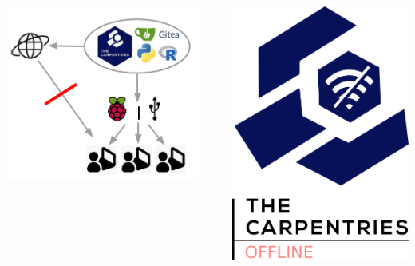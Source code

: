 \documentclass{beamer}
\date{September 5, 2023}
\author{JSS \inst{1} \and FT \inst{1} \and CS \inst{2} \\
	\and AD \inst{3} \and EPW \inst{4} \and SF \inst{5}}
\begin{document}
	\begin{frame}
		\begin{columns}
			\begin{column}{\textwidth}
				\begin{alertblock}
				\end{alertblock}
			\end{column}
		\end{columns}
		\begin{columns}
			\begin{column}{.45\textwidth}
				\centering
				\includegraphics[width=.6\columnwidth]{logos/carpentriesoffline_schemaidea.png} \\
			\end{column}
			\begin{column}{.1\textwidth}
			\end{column}
			\begin{column}{.45\textwidth}
				\centering
				\includegraphics[width=.4\columnwidth]{logos/OFFLINE_long.png}
			\end{column}
		\end{columns}
		\begin{columns}
			\begin{column}{\textwidth}
				

\end{column}
\end{columns}
\end{frame}
\end{document}
